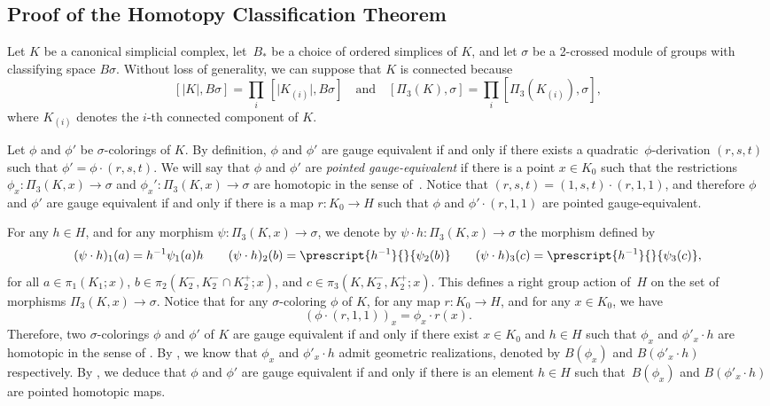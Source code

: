 \documentclass[a4paper, oneside]{amsart}
\numberwithin{equation}{subsection}
\theoremstyle{referencedlemma}
\theoremstyle{plain} %
\theoremstyle{remark}
\begin{document}
\subsection{Proof of the Homotopy Classification Theorem}

Let $K$ be a canonical simplicial complex, let~$B_*$ be a choice of ordered simplices of $K$, and let $\sigma$ be a 2-crossed module of groups with classifying space $B\sigma$. Without loss of generality, we can suppose that $K$ is connected because 
$$
[\lvert K\rvert , B\sigma] = \prod_{i}\, [\lvert K_{(i)}\rvert , B\sigma] \quad \text{and} \quad [\Pi_3(K), \sigma] = \prod_i [\Pi_3(K_{(i)}), \sigma],
$$
where $K_{(i)}$ denotes the $i$-th connected component of $K$. 

Let $\phi$ and $\phi'$ be $\sigma$-colorings of $K$.  By definition, $\phi$ and $\phi'$ are gauge equivalent if and only if there exists a quadratic~$\phi$-derivation $(r,s,t)$ such that $\phi' = \phi\cdot (r,s,t)$.  We will say that $\phi$ and $\phi'$ are \emph{pointed gauge-equivalent} if there is a point $x\in K_0$ such that the restrictions $\phi_x \colon \Pi_3(K,x)\to \sigma$ and $\phi_x'\colon \Pi_3(K, x)\to \sigma$ are homotopic in the sense of~\cite[Definition 2.14]{martins_fundamental_2011}. Notice that $(r,s,t) = (1,s,t)\cdot (r,1,1)$, and therefore $\phi$ and  $\phi'$ are gauge equivalent if and only if there is a map $r\colon K_0\to H$ such that $\phi$ and $\phi'\cdot (r,1,1)$ are pointed gauge-equivalent.   

For any $h\in H$, and for any morphism $\psi \colon \Pi_3(K,x)\to \sigma$, we denote by $\psi\cdot h\colon  \Pi_3(K,x)\to \sigma$ the morphism defined by
$$
(\psi\cdot h)_1(a) = h^{-1}\psi_1(a) h\quad \quad (\psi\cdot h)_2(b) = \prescript{h^{-1}}{}{\psi_2(b)} \quad \quad (\psi\cdot h)_3(c) = \prescript{h^{-1}}{}{\psi_3(c)},
$$
for all $a\in \pi_1(K_1;x)$, $b\in \pi_2(K_2^-, K_2^-\cap K_2^+; x)$, and $c\in \pi_3(K,K_2^-, K_2^+; x)$.  This defines a right group action of~$H$ on the set of morphisms $\Pi_3(K,x) \to \sigma$.  Notice that for any $\sigma$-coloring $\phi$ of $K$,  for any map $r\colon K_0 \to H$, and for any $x\in K_0$, we have
$$
(\phi\cdot (r,1,1))_x = \phi_x \cdot r(x).
$$
Therefore, two $\sigma$-colorings $\phi$ and $\phi'$ of $K$ are gauge equivalent if and only if there exist $x\in K_0$ and $h\in H$ such that $\phi_x$ and $\phi'_x\cdot h$ are homotopic in the sense of \cite[Definition 2.14]{martins_fundamental_2011}.  By \cite[Lemma 3.12]{martins_fundamental_2011}, we know that $\phi_x$ and $\phi'_x\cdot h$ admit geometric realizations, denoted by $B(\phi_x)$ and $B(\phi'_x\cdot h)$ respectively. By \cite[Lemma~3.16]{martins_fundamental_2011}, we deduce that $\phi$ and $\phi'$ are gauge equivalent if and only if there is an element $h\in H$ such that~$B(\phi_x)$ and $B(\phi'_x\cdot h)$ are pointed homotopic maps. 
\end{document}
